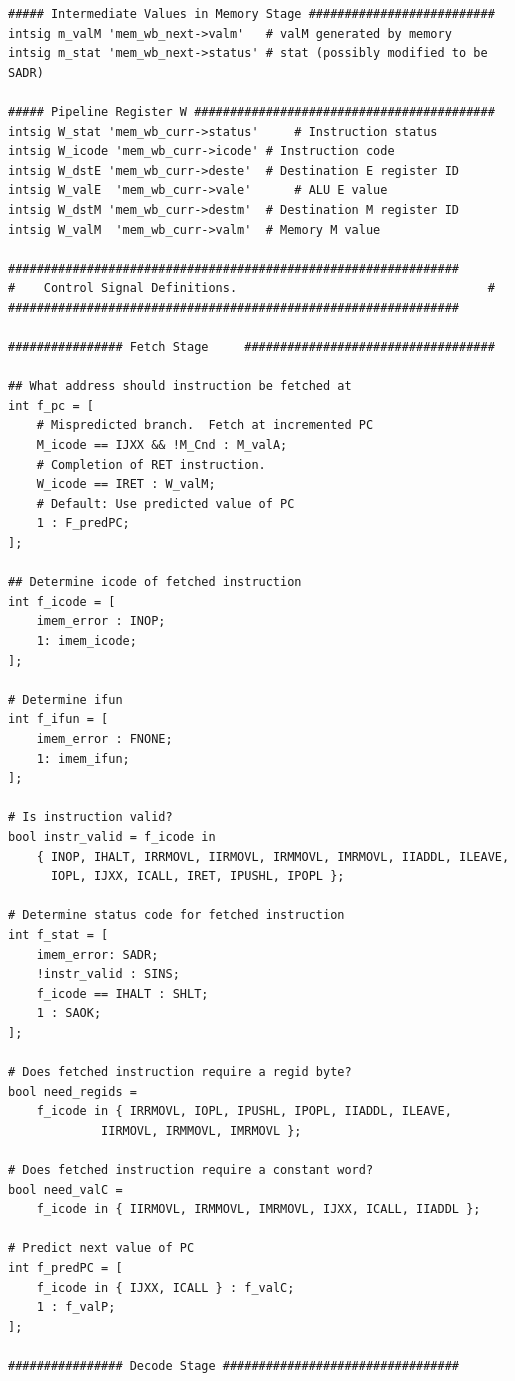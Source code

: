 \documentclass{article}
\begin{document}
\begin{itemize}
\begin{lstlisting}[caption={}]
##### Intermediate Values in Memory Stage ##########################
intsig m_valM 'mem_wb_next->valm'	# valM generated by memory
intsig m_stat 'mem_wb_next->status'	# stat (possibly modified to be SADR)

##### Pipeline Register W ##########################################
intsig W_stat 'mem_wb_curr->status'     # Instruction status
intsig W_icode 'mem_wb_curr->icode'	# Instruction code
intsig W_dstE 'mem_wb_curr->deste'	# Destination E register ID
intsig W_valE  'mem_wb_curr->vale'      # ALU E value
intsig W_dstM 'mem_wb_curr->destm'	# Destination M register ID
intsig W_valM  'mem_wb_curr->valm'	# Memory M value

###############################################################
#    Control Signal Definitions.                                   #
###############################################################

################ Fetch Stage     ###################################

## What address should instruction be fetched at
int f_pc = [
	# Mispredicted branch.  Fetch at incremented PC
	M_icode == IJXX && !M_Cnd : M_valA;
	# Completion of RET instruction.
	W_icode == IRET : W_valM;
	# Default: Use predicted value of PC
	1 : F_predPC;
];

## Determine icode of fetched instruction
int f_icode = [
	imem_error : INOP;
	1: imem_icode;
];

# Determine ifun
int f_ifun = [
	imem_error : FNONE;
	1: imem_ifun;
];

# Is instruction valid?
bool instr_valid = f_icode in
	{ INOP, IHALT, IRRMOVL, IIRMOVL, IRMMOVL, IMRMOVL, IIADDL, ILEAVE,
	  IOPL, IJXX, ICALL, IRET, IPUSHL, IPOPL };

# Determine status code for fetched instruction
int f_stat = [
	imem_error: SADR;
	!instr_valid : SINS;
	f_icode == IHALT : SHLT;
	1 : SAOK;
];

# Does fetched instruction require a regid byte?
bool need_regids =
	f_icode in { IRRMOVL, IOPL, IPUSHL, IPOPL, IIADDL, ILEAVE,
		     IIRMOVL, IRMMOVL, IMRMOVL };

# Does fetched instruction require a constant word?
bool need_valC =
	f_icode in { IIRMOVL, IRMMOVL, IMRMOVL, IJXX, ICALL, IIADDL };

# Predict next value of PC
int f_predPC = [
	f_icode in { IJXX, ICALL } : f_valC;
	1 : f_valP;
];

################ Decode Stage #################################



\end{lstlisting}
\end{itemize}
\end{document}
